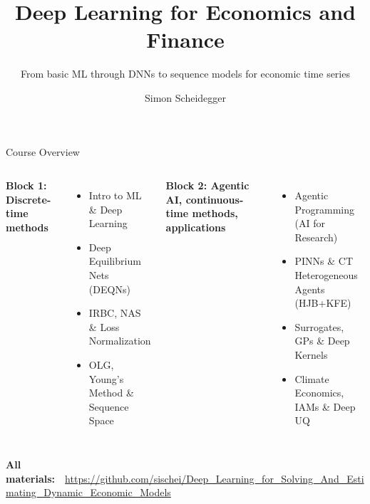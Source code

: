 \documentclass[aspectratio=169,11pt]{beamer}
\title[Deep Learning for Dynamic Economic Models]
{Deep Learning for Economics and Finance}
\subtitle{From basic ML through DNNs to sequence models for economic time series}
\author{Simon Scheidegger}
\institute[HEC Lausanne]{HEC, University of Lausanne}
\date{}
\begin{document}

{
\begin{frame}
\titlepage
\end{frame}
}

\begin{frame}{Course Overview}
\footnotesize
\begin{columns}[T]
\textbf{Block 1: Discrete-time methods}
\begin{itemize}
    \item Intro to ML \& Deep Learning
    \item Deep Equilibrium Nets (DEQNs)
    \item IRBC, NAS \& Loss Normalization
    \item OLG, Young's Method \& Sequence Space
\end{itemize}

\textbf{Block 2: Agentic AI, continuous-time methods, applications}
\begin{itemize}
    \item Agentic Programming (AI for Research)
    \item PINNs \& CT Heterogeneous Agents (HJB+KFE)
    \item Surrogates, GPs \& Deep Kernels
    \item Climate Economics, IAMs \& Deep UQ
\end{itemize}
\end{columns}
\normalsize

\vspace{0.6cm}
\begin{center}
\textbf{All materials:}~~\url{https://github.com/sischei/Deep_Learning_for_Solving_And_Estimating_Dynamic_Economic_Models}\\[4pt]
\end{center}
\end{frame}
\end{document}
